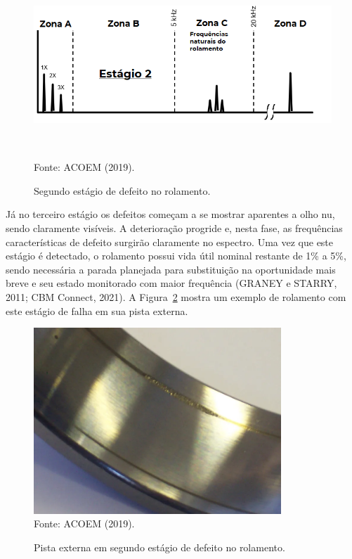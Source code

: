 \documentclass[
	12pt,				
	oneside,			
	a4paper,			
	english,			
	brazil,			
	]{abntex2ppgsi}
\begin{document}
\begin{figure}[H]
\centering
\caption {Segundo estágio de defeito no rolamento.}
\includegraphics[width=\textwidth,height=70mm,keepaspectratio]{estagio_2} \\
Fonte: ACOEM (2019).
\label{estagio_2}
\end{figure}

Já no terceiro estágio os defeitos começam a se mostrar aparentes a olho nu, sendo claramente visíveis. A deterioração progride e, nesta fase, as frequências características de defeito surgirão claramente no espectro. Uma vez que este estágio é detectado, o rolamento possui vida útil nominal restante de 1\% a 5\%, sendo necessária a parada planejada para substituição na oportunidade mais breve e seu estado monitorado com maior frequência (GRANEY e STARRY, 2011; CBM Connect, 2021). A Figura~\ref{estagio_tres_pista_externa} mostra um exemplo de rolamento com este estágio de falha em sua pista externa.

\begin{figure}[H]
\centering
\caption {Pista externa em segundo estágio de defeito no rolamento.}
\includegraphics[width=\textwidth,height=70mm,keepaspectratio]{estagio_tres_pista_externa} \\
Fonte: ACOEM (2019).
\label{estagio_tres_pista_externa}
\end{figure}
\end{document}
